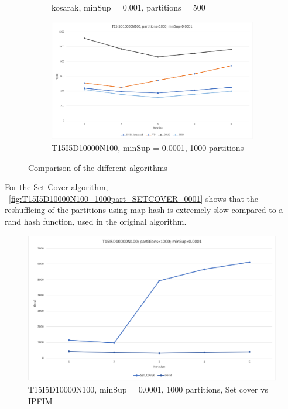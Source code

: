 \begin{figure}[H]
\begin{subfigure}{\linewidth}
  \caption{kosarak, minSup = 0.001,  partitions = 500}
  \label{fig:kosarak_500part_001}
\end{subfigure}
  \begin{subfigure}{\linewidth}
  \centering
  \includegraphics[width=\linewidth ,height=\textheight, keepaspectratio]{figures/4iterations/T15I5D10000N100_1000part_0001}
  \caption{T15I5D10000N100, minSup = 0.0001,  1000 partitions}
  \label{fig:T15I5D10000N100_1000part_0001}
\end{subfigure}
\caption{Comparison of the different algorithms}
\end{figure}

For the Set-Cover algorithm, ~\autoref{fig:T15I5D10000N100_1000part_SETCOVER_0001} shows that the reshuffleing of the partitions using map hash is extremely slow compared to a rand hash function, used in the original algorithm.
\begin{figure}[H]
  \centering
  \includegraphics[width=\linewidth]{figures/4iterations/T15I5D10000N100_1000part_SETCOVER_0001}
  \caption{T15I5D10000N100, minSup = 0.0001,  1000 partitions, Set cover vs IPFIM}
  \label{fig:T15I5D10000N100_1000part_SETCOVER_0001}
\end{figure}


